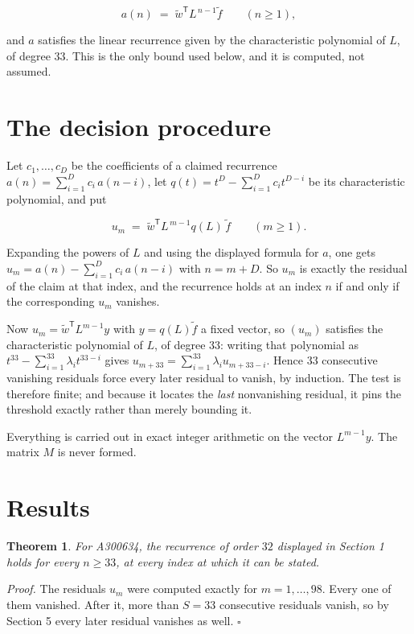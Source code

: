 \documentclass[11pt]{article}
\newtheorem{theorem}{Theorem}
\theoremstyle{definition}
\begin{document}
\[a(n) \;=\; \tilde w^{\mathsf T} L^{\,n-1} \tilde f \qquad (n \ge 1),\]

and $a$ satisfies the linear recurrence given by the characteristic polynomial of $L$, of degree $33$. This is the only bound used below, and it is computed, not assumed.

\section{The decision procedure}

Let $c_1,\dots,c_D$ be the coefficients of a claimed recurrence $a(n) = \sum_{i=1}^{D} c_i\,a(n-i)$, let $q(t) = t^{D} - \sum_{i=1}^{D} c_i t^{D-i}$ be its characteristic polynomial, and put

\[u_m \;=\; \tilde w^{\mathsf T} L^{\,m-1} q(L)\,\tilde f \qquad (m \ge 1).\]

Expanding the powers of $L$ and using the displayed formula for $a$, one gets $u_m = a(n) - \sum_{i=1}^{D} c_i\,a(n-i)$ with $n = m + D$. So $u_m$ is exactly the residual of the claim at that index, and the recurrence holds at an index $n$ if and only if the corresponding $u_m$ vanishes.

Now $u_m = \tilde w^{\mathsf T} L^{m-1} y$ with $y = q(L)\tilde f$ a fixed vector, so $(u_m)$ satisfies the characteristic polynomial of $L$, of degree $33$: writing that polynomial as $t^{33} - \sum_{i=1}^{33} \lambda_i t^{33-i}$ gives $u_{m+33} = \sum_{i=1}^{33} \lambda_i u_{m+33-i}$. Hence $33$ consecutive vanishing residuals force every later residual to vanish, by induction. The test is therefore finite; and because it locates the {\itshape last} nonvanishing residual, it pins the threshold exactly rather than merely bounding it.

Everything is carried out in exact integer arithmetic on the vector $L^{m-1}y$. The matrix $M$ is never formed.

\section{Results}

\begin{theorem} For A300634, the recurrence of order $32$ displayed in Section 1 holds for every $n \ge 33$, at every index at which it can be stated.\end{theorem}

{\itshape Proof.} The residuals $u_m$ were computed exactly for $m = 1,\dots,98$. Every one of them vanished. After it, more than $S = 33$ consecutive residuals vanish, so by Section 5 every later residual vanishes as well. $\square$
\end{document}
